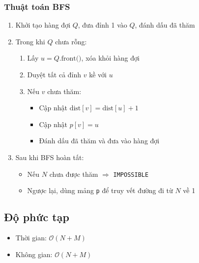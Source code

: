 \documentclass{article}
\begin{document}
	\subsubsection{Thuật toán BFS}
	\begin{enumerate}
		\item Khởi tạo hàng đợi \( Q \), đưa đỉnh 1 vào \( Q \), đánh dấu đã thăm
		\item Trong khi \( Q \) chưa rỗng:
		\begin{enumerate}
			\item Lấy \( u = Q.\text{front()} \), xóa khỏi hàng đợi
			\item Duyệt tất cả đỉnh \( v \) kề với \( u \)
			\item Nếu \( v \) chưa thăm:
			\begin{itemize}
				\item Cập nhật \( \text{dist}[v] = \text{dist}[u] + 1 \)
				\item Cập nhật \( p[v] = u \)
				\item Đánh dấu đã thăm và đưa vào hàng đợi
			\end{itemize}
		\end{enumerate}
		\item Sau khi BFS hoàn tất:
		\begin{itemize}
			\item Nếu \( N \) chưa được thăm \( \Rightarrow \) \texttt{IMPOSSIBLE}
			\item Ngược lại, dùng mảng \texttt{p} để truy vết đường đi từ \( N \) về 1
		\end{itemize}
	\end{enumerate}
	
	\subsection{Độ phức tạp}
	\begin{itemize}
		\item Thời gian: \( \mathcal{O}(N + M) \)
		\item Không gian: \( \mathcal{O}(N + M) \)
	\end{itemize}

	
\end{document}
